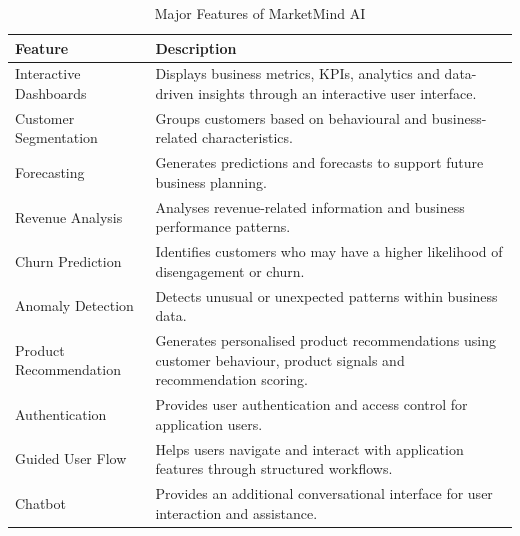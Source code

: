 \documentclass[12pt,a4paper]{report}
\begin{document}
\begin{table}[H]
\centering
\caption{Major Features of MarketMind AI}
\label{tab:key-features}

\begin{tabular}{p{4cm} p{9cm}}

\toprule

\textbf{Feature} &
\textbf{Description}

\\

\midrule

Interactive Dashboards &
Displays business metrics, KPIs, analytics and data-driven insights
through an interactive user interface.
\\[8pt]

Customer Segmentation &
Groups customers based on behavioural and business-related
characteristics.
\\[8pt]

Forecasting &
Generates predictions and forecasts to support future business
planning.
\\[8pt]

Revenue Analysis &
Analyses revenue-related information and business performance
patterns.
\\[8pt]

Churn Prediction &
Identifies customers who may have a higher likelihood of
disengagement or churn.
\\[8pt]

Anomaly Detection &
Detects unusual or unexpected patterns within business data.
\\[8pt]

Product Recommendation &
Generates personalised product recommendations using customer
behaviour, product signals and recommendation scoring.
\\[8pt]

Authentication &
Provides user authentication and access control for application
users.
\\[8pt]

Guided User Flow &
Helps users navigate and interact with application features through
structured workflows.
\\[8pt]

Chatbot &
Provides an additional conversational interface for user
interaction and assistance.
\\

\bottomrule

\end{tabular}

\end{table}
\end{document}
